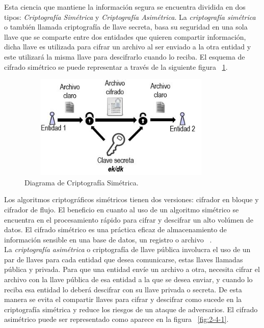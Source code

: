 Esta ciencia que mantiene la información segura se encuentra dividida en dos tipos: \textit{Criptografía Simétrica} y \textit{Criptografía Asimétrica}. La \textit{ criptografía simétrica} o también llamada criptografía de llave secreta, basa su seguridad en una sola llave que se comparte entre dos entidades que quieren compartir información, dicha llave es utilizada para cifrar un archivo al ser enviado a la otra entidad y este utilizará la misma llave para descifrarlo cuando lo reciba. El esquema de cifrado simétrico se puede representar a través de la siguiente figura ~\ref{fig:2-3-1}. \\

\begin{figure}[H]
\centering
\includegraphics[width=10cm, height=5cm]{./images/Cripto_Simetrica.jpg}
\caption{Diagrama de Criptografía Simétrica.}
\label{fig:2-3-1}
\end{figure}

Los algoritmos criptográficos simétricos tienen dos versiones: cifrador en bloque y cifrador de flujo. El beneficio en cuanto al uso de un algoritmo simétrico se encuentra en el procesamiento rápido para cifrar y descifrar un alto volúmen de datos. El cifrado simétrico es una práctica eficaz de almacenamiento de información sensible en una base de datos, un registro o archivo ~\cite{sime}. \\

La \textit{ criptografía asimétrica} o criptografía de llave pública involucra el uso de un par de llaves para cada entidad que desea comunicarse, estas llaves llamadas pública y privada. Para que una entidad envíe un archivo a otra, necesita cifrar el archivo con la llave pública de esa entidad a la que se desea enviar, y cuando lo reciba esa entidad lo deberá descifrar con su llave privada o secreta. De esta manera se evita el compartir llaves para cifrar y descifrar como sucede en la criptografía simétrica y reduce los riesgos de un ataque de adversarios. El cifrado asimétrico puede ser representado como aparece en la figura ~\ref{fig:2-4-1}. \\

